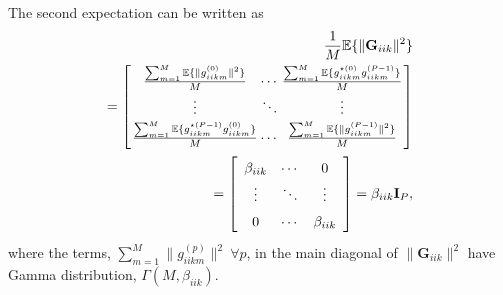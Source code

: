 \documentclass[journal,12pt,onecolumn]{IEEEtran}
\begin{document}
The second expectation can be written as
\begin{equation}\label{eq:second_term_expectation}
\begin{split}
\frac{1}{M} \mathbb{E}\{ \lVert \textbf{G}_{iik} \rVert^{2} \} \\ = \arraycolsep=1pt\def\arraystretch{1.5} \left[\begin{array}{ccc} \frac{\sum_{m=1}^{M} \mathbb{E} \{ \lVert g_{iikm}^{(0)} \rVert^{2} \}}{M} & \cdots & \frac{\sum_{m=1}^{M} \mathbb{E} \{ g_{iikm}^{\star (0)}g_{iikm}^{(P-1)} \}}{M} \\
\vdots & \ddots & \vdots \\
\frac{\sum_{m=1}^{M} \mathbb{E} \{ g_{iikm}^{\star(P-1)}g_{iikm}^{(0)} \} }{M} & \cdots & \frac{\sum_{m=1}^{M} \mathbb{E} \{ \lVert g_{iikm}^{(P-1)} \rVert^{2} \} }{M}
\end{array} \right] \\ 
= \left[\begin{array}{ccc} \beta_{iik} & \cdots & 0 \\
\vdots & \ddots & \vdots \\
0 & \cdots & \beta_{iik}
\end{array} \right] = \beta_{iik} \textbf{I}_{P},
\end{split}
\end{equation}
where the terms, $\sum_{m=1}^{M} \lVert g_{iikm}^{(p)} \rVert^{2} \ \forall p$, in the main diagonal of $\lVert \textbf{G}_{iik} \rVert^{2}$ have Gamma distribution, $\Gamma(M,\beta_{iik})$.
\end{document}
